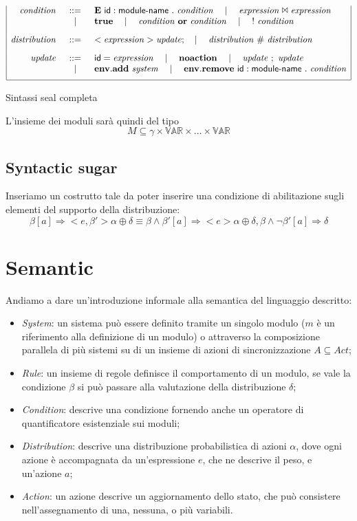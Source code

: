 \begin{table}
$$\begin{array}{|rcl|}
\mathit{condition} &::=& \mathbf{E} \mbox{ } {\sf id}:{\sf module}\textrm{-}{\sf name} \mbox{ } . \mbox{ } \mathit{condition} \quad\mid\quad \mathit{expression} \Join \mathit{expression} \\
	& \quad\mid\quad & \mathbf{true} \quad\mid\quad \mathit{condition} \mbox{ } \mathbf{or} \mbox{ } \mathit{condition} \quad\mid\quad {\sf !} \mbox{ } \mathit{condition}
	\\[.3cm]
\mathit{distribution} &::=& <\mathit{expression}> \mathit{update}; \quad\mid\quad \mathit{distribution} \mbox{ } \# \mbox{ } \mathit{distribution}
	\\[.3cm]
\mathit{update} &::=& {\sf id} = \mathit{expression} \quad\mid\quad \mathbf{noaction} \quad\mid\quad \mathit{update} \mbox{ } ; \mbox{ } \mathit{update} \\
	& \quad\mid\quad & \mathbf{env.add} \mbox{ } \mathit{system} \quad\mid\quad \mathbf{env.remove} \mbox{ } {\sf id}:{\sf module}\textrm{-}{\sf name} \mbox{ } . \mbox{ } \mathit{condition} 
	\\[.2cm]
\hline
\end{array}
$$
\label{tab:sealsyntax}
\caption{Sintassi \ac{seal} completa}
\end{table}

L'insieme dei moduli sarà quindi del tipo
$$ M \subseteq \gamma \times \mathbb{VAR} \times \dots \times \mathbb{VAR} $$

\subsection{Syntactic sugar}
Inseriamo un costrutto tale da poter inserire una condizione di abilitazione sugli elementi del supporto della distribuzione:
$$
\beta [a]\Rightarrow <e,\beta'> \alpha \oplus \delta
\equiv 
\beta \wedge \beta' [a]\Rightarrow <e> \alpha \oplus \delta,
\beta \wedge \neg\beta' [a]\Rightarrow \delta
$$

\section{Semantic}
Andiamo a dare un'introduzione informale alla semantica del linguaggio descritto:
\begin{itemize}
	\item \emph{System}: un sistema può essere definito tramite un singolo modulo ($m$ è un riferimento alla definizione di un modulo) o attraverso la composizione parallela di più sistemi su di un insieme di azioni di sincronizzazione $A \subseteq Act$;
	\item \emph{Rule}: un insieme di regole definisce il comportamento di un modulo, se vale la condizione $\beta$ si può passare alla valutazione della distribuzione $\delta$;
	\item \emph{Condition}: descrive una condizione fornendo anche un operatore di quantificatore esistenziale sui moduli;
	\item \emph{Distribution}: descrive una distribuzione probabilistica di azioni $\alpha$, dove ogni azione è accompagnata da un'espressione $e$, che ne descrive il peso, e un'azione $a$;
	\item \emph{Action}: un azione descrive un aggiornamento dello stato, che può consistere nell'assegnamento di una, nessuna, o più variabili.
\end{itemize}

